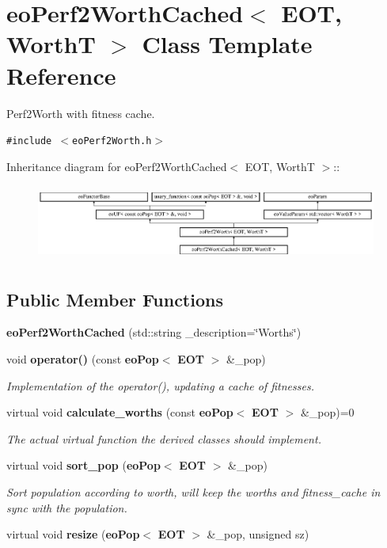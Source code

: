 \section{eo\-Perf2Worth\-Cached$<$ EOT, Worth\-T $>$ Class Template Reference}
\label{classeo_perf2_worth_cached}
Perf2Worth with fitness cache.  


{\tt \#include $<$eo\-Perf2Worth.h$>$}

Inheritance diagram for eo\-Perf2Worth\-Cached$<$ EOT, Worth\-T $>$::\begin{figure}[H]
\begin{center}
\leavevmode
\includegraphics[height=2.52252cm]{classeo_perf2_worth_cached}
\end{center}
\end{figure}
\subsection*{Public Member Functions}
\begin{CompactItemize}
\item 
{\bf eo\-Perf2Worth\-Cached} (std::string \_\-description=\char`\"{}Worths\char`\"{})\label{classeo_perf2_worth_cached_a0}

\item 
void {\bf operator()} (const {\bf eo\-Pop}$<$ {\bf EOT} $>$ \&\_\-pop)
\begin{CompactList}\small\item\em Implementation of the operator(), updating a cache of fitnesses. \item\end{CompactList}\item 
virtual void {\bf calculate\_\-worths} (const {\bf eo\-Pop}$<$ {\bf EOT} $>$ \&\_\-pop)=0\label{classeo_perf2_worth_cached_a2}

\begin{CompactList}\small\item\em The actual virtual function the derived classes should implement. \item\end{CompactList}\item 
virtual void {\bf sort\_\-pop} ({\bf eo\-Pop}$<$ {\bf EOT} $>$ \&\_\-pop)\label{classeo_perf2_worth_cached_a3}

\begin{CompactList}\small\item\em Sort population according to worth, will keep the worths and fitness\_\-cache in sync with the population. \item\end{CompactList}\item 
virtual void {\bf resize} ({\bf eo\-Pop}$<$ {\bf EOT} $>$ \&\_\-pop, unsigned sz)\label{classeo_perf2_worth_cached_a4}

\end{CompactItemize}
